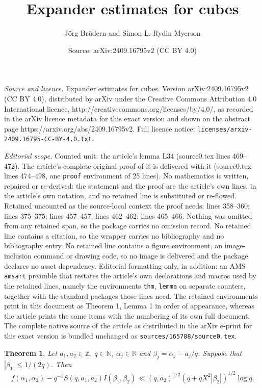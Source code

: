 \documentclass[10pt,a4paper]{amsart}
\title{Expander estimates for cubes}
\author{J\"org Brüdern and Simon L. Rydin Myerson}
\date{Source: arXiv:2409.16795v2 (CC BY 4.0)}
\newtheorem{thm}{Theorem}
\begin{document}
\maketitle

\noindent\emph{Source and licence.} Expander estimates for cubes. Version arXiv:2409.16795v2 (CC BY 4.0), distributed by arXiv under the Creative Commons Attribution 4.0 International licence, http://creativecommons.org/licenses/by/4.0/, as recorded in the arXiv licence metadata for this exact version and shown on the abstract page https://arxiv.org/abs/2409.16795v2. Full licence notice: \texttt{licenses/arxiv-2409.16795-CC-BY-4.0.txt}.\par\smallskip

\noindent\textit{Editorial scope.} Counted unit: the article's lemma L34 (source0.tex lines 469--472). The article's complete original proof of it is delivered with it (source0.tex lines 474--498, one \texttt{proof} environment of 25 lines). No mathematics is written, repaired or re-derived: the statement and the proof are the article's own lines, in the article's own notation, and no retained line is substituted or re-flowed.  Retained uncounted as the source-local context the proof needs: lines 358--360; lines 375--375; lines 457--457; lines 462--462; lines 465--466.  Nothing was omitted from any retained span, so the package carries no omission record.  No retained line contains a citation, so the wrapper carries no bibliography and no bibliography entry.  No retained line contains a figure environment, an image-inclusion command or drawing code, so no image is delivered and the package declares no asset dependency.  Editorial formatting only, in addition: an AMS \texttt{amsart} preamble that restates the article's own declarations and macros used by the retained lines, namely the environments \texttt{thm}, \texttt{lemma} on separate counters, together with the standard packages those lines need.  The retained environments print in this document as Theorem 1, Lemma 1 in order of appearance, whereas the article prints the same items with the numbering of its own full document.  The complete native source of the article as distributed in the arXiv e-print for this exact version is bundled unchanged as \texttt{sources/165788/source0.tex}.
\begin{thm}\label{quadWeyl} Let $a_1,a_2\in\mathbb Z$, $q\in\mathbb N$, $\alpha_j\in\mathbb R$ and $\beta_j = \alpha_j-a_j/q$. Suppose that $|\beta_1|\le 1/(2q)$. Then
$$ f(\alpha_1,\alpha_2) - q^{-1}S(q,a_1,a_2)I(\beta_1,\beta_2) \ll (q,a_2)^{1/2} (q+qX^2|\beta_2|)^{1/2} \log q. $$
\end{thm}
\end{document}
